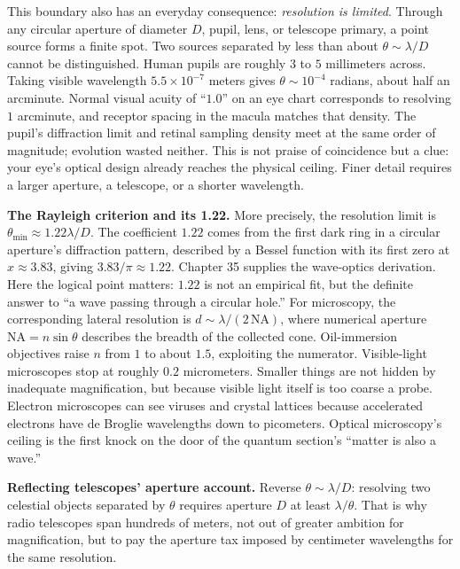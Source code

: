 \begin{mainline}
This boundary also has an everyday consequence: \emph{resolution is limited}. Through any circular aperture of diameter $D$, pupil, lens, or telescope primary, a point source forms a finite spot. Two sources separated by less than about $\theta\sim\lambda/D$ cannot be distinguished. Human pupils are roughly $3$ to $5$ millimeters across. Taking visible wavelength $5.5\times10^{-7}$ meters gives $\theta\sim10^{-4}$ radians, about half an arcminute. Normal visual acuity of ``$1.0$'' on an eye chart corresponds to resolving $1$ arcminute, and receptor spacing in the macula matches that density. The pupil's diffraction limit and retinal sampling density meet at the same order of magnitude; evolution wasted neither. This is not praise of coincidence but a clue: your eye's optical design already reaches the physical ceiling. Finer detail requires a larger aperture, a telescope, or a shorter wavelength.

\end{mainline}

\begin{challenge}
\textbf{The Rayleigh criterion and its 1.22.} More precisely, the resolution limit is $\theta_{\min}\approx1.22\lambda/D$. The coefficient $1.22$ comes from the first dark ring in a circular aperture's diffraction pattern, described by a Bessel function with its first zero at $x\approx3.83$, giving $3.83/\pi\approx1.22$. Chapter 35 supplies the wave-optics derivation. Here the logical point matters: $1.22$ is not an empirical fit, but the definite answer to ``a wave passing through a circular hole.'' For microscopy, the corresponding lateral resolution is $d\sim\lambda/(2\,\mathrm{NA})$, where numerical aperture $\mathrm{NA}=n\sin\theta$ describes the breadth of the collected cone. Oil-immersion objectives raise $n$ from $1$ to about $1.5$, exploiting the numerator. Visible-light microscopes stop at roughly $0.2$ micrometers. Smaller things are not hidden by inadequate magnification, but because visible light itself is too coarse a probe. Electron microscopes can see viruses and crystal lattices because accelerated electrons have de Broglie wavelengths down to picometers. Optical microscopy's ceiling is the first knock on the door of the quantum section's ``matter is also a wave.''

\textbf{Reflecting telescopes' aperture account.} Reverse $\theta\sim\lambda/D$: resolving two celestial objects separated by $\theta$ requires aperture $D$ at least $\lambda/\theta$. That is why radio telescopes span hundreds of meters, not out of greater ambition for magnification, but to pay the aperture tax imposed by centimeter wavelengths for the same resolution.
\end{challenge}

